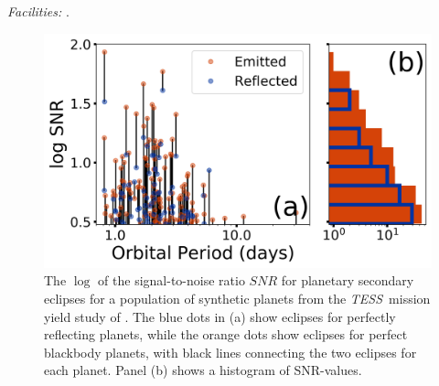 \documentclass[manuscript]{aastex}
\newcommand{\tess}{{\it TESS}}
\begin{document}


\acknowledgments



{\it Facilities:} .




\begin{figure}

\includegraphics[width=\textwidth]{eclipse_estimates.jpg}
\caption{The $\log$ of the signal-to-noise ratio $SNR$ for planetary secondary eclipses for a population of synthetic planets from the \tess\ mission yield study of \citet{2018arXiv180405050B}. The blue dots in (a)  show eclipses for perfectly reflecting planets, while the orange dots show eclipses for perfect blackbody planets, with black lines connecting the two eclipses for each planet. Panel (b) shows a histogram of SNR-values. \label{fig:eclipse_estimates}}

\end{figure}
\end{document}
